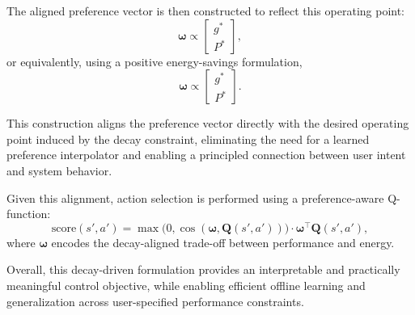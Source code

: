 The aligned preference vector is then constructed to reflect this operating point:
\begin{equation}
\boldsymbol{\omega} \propto 
\begin{bmatrix}
g^* \\
P^*
\end{bmatrix},
\end{equation}
or equivalently, using a positive energy-savings formulation,
\begin{equation}
\boldsymbol{\omega} \propto 
\begin{bmatrix}
g^* \\
 P^*
\end{bmatrix}.
\end{equation}

This construction aligns the preference vector directly with the desired operating point induced by the decay constraint, eliminating the need for a learned preference interpolator and enabling a principled connection between user intent and system behavior.

Given this alignment, action selection is performed using a preference-aware Q-function:
\begin{equation}
\text{score}(s',a') =
\max\!\big(0,\cos(\boldsymbol{\omega},\mathbf{Q}(s',a'))\big)
\cdot
\boldsymbol{\omega}^{\top}\mathbf{Q}(s',a'),
\end{equation}
where $\boldsymbol{\omega}$ encodes the decay-aligned trade-off between performance and energy.

Overall, this decay-driven formulation provides an interpretable and practically meaningful control objective, while enabling efficient offline learning and generalization across user-specified performance constraints.
